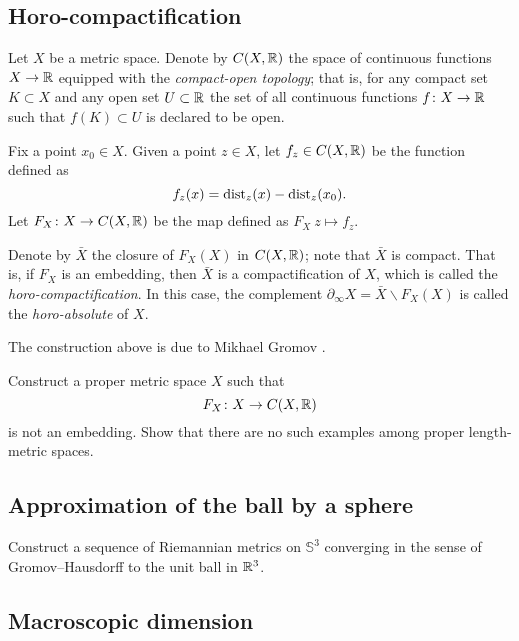 \subsection*{Horo-compactification\easy}
\label{Horocompactification}

Let $X$ be a metric space.
Denote by $C(X,\mathbb{R})$ the space of continuous functions $X\to \mathbb{R}$
equipped with the \emph{compact-open topology};
that is, for any compact set $K\subset X$ and any open set $U\subset \mathbb{R}$
the set of all continuous functions $f\colon X\to \mathbb{R}$ such that $f(K)\subset U$
is declared to be open.

Fix a point $x_0\in X$.
Given a point $z\in X$, let $f_z\in C(X,\mathbb{R})$ be the function defined as 
\[f_z(x)=\operatorname{\rm dist}\nolimits_z(x)-\operatorname{\rm dist}\nolimits_z(x_0).\]
Let $F_X\colon X\to C(X,\mathbb{R})$ be the map 
defined as $F_X\:z\mapsto f_z$.

Denote by $\bar X$ 
the closure of $F_X(X)$ in $C(X,\mathbb{R})$;
note that $\bar X$ is compact.
That is, 
if $F_X$ is an embedding, 
then $\bar X$ is a compactification of $X$,
which is called the \emph{horo-compactification}.
In this case, the complement 
$\partial_\infty X=\bar X\backslash F_X(X)$ 
is called the {}\emph{horo-absolute} of $X$.

The construction above is due to Mikhael Gromov \cite[see][]{gromov-hyperbolic}.

\begin{pr}
Construct a proper metric space $X$
such that 
\[F_X\colon X\to C(X,\mathbb{R})\] 
is not an embedding.
Show that there are no such examples among proper length-metric spaces.
\end{pr}

\subsection*{Approximation of the ball by a sphere}
\label{3-sphere is close to a ball}

\begin{pr}
Construct a sequence of Riemannian metrics on $\mathbb{S}^3$ converging in the sense of Gromov--Hausdorff 
to the unit ball in $\mathbb{R}^3$.
\end{pr}

\subsection*{Macroscopic dimension\easy}
\label{macroscopic dimension} 

